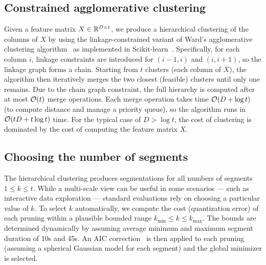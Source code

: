 \documentclass{article}
\begin{document}
\subsection{Constrained agglomerative clustering}
Given a feature matrix $X \in \mathbb{R}^{D\times t}$, we produce a hierarchical clustering of the columns of $X$ by using the
linkage-constrained variant of Ward's agglomerative clustering algorithm~\cite{ward1963hierarchical} as implemented in
Scikit-learn~\cite{pedregosa2011scikit}.  Specifically, for each column $i$, linkage constraints are introduced for $(i-1, i)$ and
$(i, i+1)$, so the linkage graph forms a chain.  Starting from $t$ clusters (each column of $X$), the algorithm then iteratively 
merges the two closest (feasible) clusters until only one remains.
Due to the chain graph constraint, the full hierarchy is computed after at most $\mathcal{O}(t)$ merge operations. Each merge operation
takes time $\mathcal{O}(D + \log t)$ (to compute distance and manage a priority queue), so the algorithm runs in $\mathcal{O}(tD + t\log t)$ time.
For the typical case of $D > \log t$, the cost of clustering is dominated by the cost of computing the feature matrix $X$.

\subsection{Choosing the number of segments}
The hierarchical clustering produces segmentations for all numbers of segments $1 \leq k \leq t$.  While a multi-scale view can 
be useful in some scenarios --- such as interactive data exploration --- standard evaluations rely on choosing a particular value 
of $k$. To select $k$ automatically, we compute the cost (quantization error) of each pruning within a plausible bounded range 
$k_{\min} \leq k \leq k_{\max}$.  The bounds are determined dynamically by assuming average minimum and maximum segment duration 
of 10s and 45s.  An AIC correction~\cite{akaike1973information} is then applied to each pruning (assuming a spherical Gaussian
model for each segment) and the global minimizer is selected.
\end{document}
